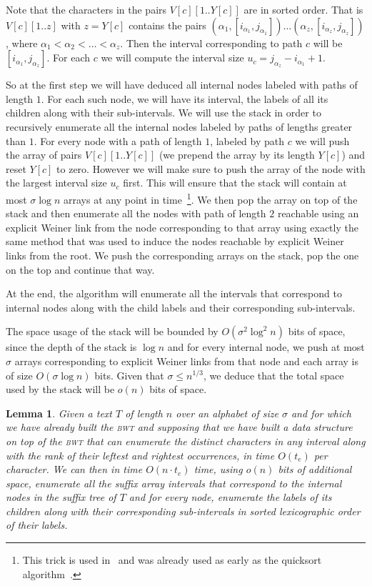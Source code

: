 \documentclass[a4paper]{article}
\newtheorem{lemma}{Lemma}
\begin{document}
Note that the characters in the pairs $V[c][1..Y[c]]$ are in sorted order. 
That is $V[c][1..z]$ with $z=Y[c]$ contains the pairs 
$(\alpha_1,[i_{\alpha_1},j_{\alpha_1}])\ldots (\alpha_z,[i_{\alpha_z},j_{\alpha_z}])$, 
where $\alpha_1<\alpha_2<\ldots <\alpha_z$. Then the interval corresponding to 
path $c$ will be $[i_{\alpha_1},j_{\alpha_z}]$. For each $c$ we will 
compute the interval size $u_c=j_{\alpha_z}-i_{\alpha_1}+1$. 

So at the first step we will have deduced all internal nodes labeled with paths 
of length $1$. For each such node, we will have its interval, the labels 
of all its children along with their sub-intervals. 
We will use the stack in order to recursively enumerate 
all the internal nodes labeled by paths of lengths greater than $1$. 
For every node with a path of length $1$, labeled by path $c$ we will 
push the array of pairs $V[c][1..Y[c]]$ (we prepend the array by its length $Y[c]$)
and reset $Y[c]$ to zero. 
However we will make sure to push the array of the node with the largest interval size $u_c$ first. 
This will ensure that the stack will contain at most $\sigma\log n$ arrays at any point in time~\footnote
{This trick is used in~\cite{BCKM13} and was already used as early as the quicksort 
algorithm~\cite{hoare1962quicksort}.}. 
We then pop the array on top of the stack and then enumerate all the nodes with path of length $2$
reachable using an explicit Weiner link from the node corresponding to that array
using exactly the same method that was used to induce the nodes reachable by explicit Weiner links from 
the root. We push the corresponding arrays on the stack, pop the one on the top
and continue that way. 

At the end, the algorithm will enumerate all the intervals that correspond to internal 
nodes along with the child labels and their corresponding sub-intervals. 

The space usage of the stack will be bounded by $O(\sigma^2\log^2n)$ bits of space, since the 
depth of the stack is $\log n$ and for every internal node, we push at most $\sigma$ arrays 
corresponding to explicit Weiner links from that node and each array is of size $O(\sigma\log n)$ bits. 
Given that $\sigma\leq n^{1/3}$, we deduce that the total space used by the stack will be $o(n)$ bits
of space. 

\begin{lemma}
\label{lemma:enum_intervals}
Given a text $T$ of length $n$ over an alphabet of size $\sigma$ and for which we have already built the \textsc{bwt}  
and supposing that we have built a data structure on top of the \textsc{bwt} that can enumerate the distinct characters 
in any interval along with the rank of their leftest and rightest occurrences, in time $O(t_e)$ per character. 
We can then in time $O(n\cdot t_e)$ time,  using $o(n)$ bits of additional space, enumerate all the suffix array intervals that correspond to the internal nodes  in the suffix tree of $T$ and for every node, enumerate the labels of its children along with their corresponding sub-intervals in sorted lexicographic order of their labels. 
\end{lemma}
\end{document}
